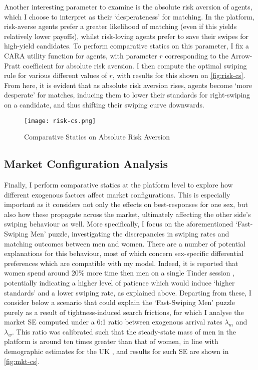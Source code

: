 Another interesting parameter to examine is the absolute risk aversion of agents, which I choose to interpret as their `desperateness' for matching.
In the platform, risk-averse agents prefer a greater likelihood of matching (even if this yields relatively lower payoffs), whilst risk-loving agents prefer to save their swipes for high-yield candidates. 
To perform comparative statics on this parameter, I fix a CARA utility function for agents, with parameter $r$ corresponding to the Arrow-Pratt coefficient for absolute risk aversion. 
I then compute the optimal swiping rule for various different values of $r$, with results for this shown on \autoref{fig:risk-cs}.
From here, it is evident that as absolute risk aversion rises, agents become `more desperate' for matches, inducing them to lower their standards for right-swiping on a candidate, and thus shifting their swiping curve downwards.

\begin{figure}[ht]
    \centering
    \caption{Comparative Statics on Absolute Risk Aversion}
    \texttt{[image: risk-cs.png]}
    \label{fig:risk-cs} 
\end{figure}

\subsection{Market Configuration Analysis}\label{sec:section3.3} 
Finally, I perform comparative statics at the platform level to explore how different exogenous factors affect market configurations. 
This is especially important as it considers not only the effects on best-responses for one sex, but also how these propagate across the market, ultimately affecting the other side's swiping behaviour as well. 
More specifically, I focus on the aforementioned `Fast-Swiping Men' puzzle, investigating the discrepancies in swiping rates and matching outcomes between men and women. 
There are a number of potential explanations for this behaviour, most of which concern sex-specific differential preferences which are compatible with my model. 
Indeed, it is reported that women spend around 20\% more time then men on a single Tinder session \citep{web:nytimes_patience}, potentially indicating a higher level of patience which would induce `higher standards' and a lower swiping rate, as explained above.
Departing from these, I consider below a scenario that could explain the `Fast-Swiping Men' puzzle purely as a result of tightness-induced search frictions, for which I analyse the market SE computed under a 6:1 ratio between exogenous arrival rates $\lambda_m$ and $\lambda_w$.  
This ratio was calibrated such that the steady-state mass of men in the platform is around ten times greater than that of women, in line with demographic estimates for the UK \citep{web:tinder_stats}, and results for such SE are shown in \autoref{fig:mkt-cs}. 

